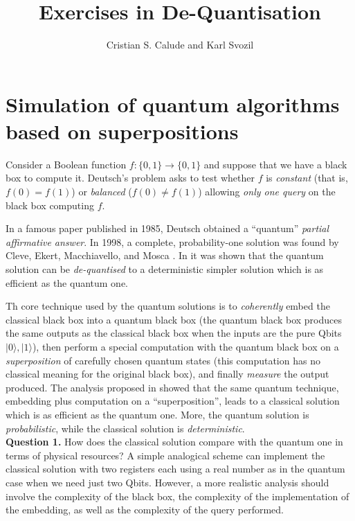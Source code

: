 \documentclass[11pt]{article}
\title{Exercises in De-Quantisation}
\author{Cristian S. Calude and Karl Svozil}
\begin{document}
\maketitle
\section{Simulation of quantum algorithms based on superpositions}
Consider a Boolean function $f: \{0,1\} \rightarrow \{0,1\}$
and suppose that we have a black box to compute it.
Deutsch's problem asks to test
whether $f$ is {\it constant} (that is, $f(0) = f(1)$) or {\it balanced} ($f(0) \not= f(1)$) allowing  {\it only one query} on the black box computing $f$.

In a famous paper published in 1985,  Deutsch \cite{D85} obtained a ``quantum''  {\it partial affirmative answer}.  In 1998, a complete, probability-one
solution was found by Cleve, Ekert, Macchiavello, and Mosca \cite{CEMM}. In \cite{Cris}
it was shown that the quantum solution can be {\it de-quantised} to a deterministic simpler solution which is as efficient as the quantum one.

Th core technique used  by the quantum solutions is to {\it coherently} embed the classical black box into a quantum black box (the quantum black box produces the same outputs as the classical black box when the inputs are the pure Qbits $|0\rangle, |1\rangle$), then perform a special computation with the quantum black box on a {\it superposition} of carefully chosen quantum states (this computation has
no classical meaning for the original black box), and finally {\it measure} the output produced. The analysis proposed in \cite{Cris} showed that
the same quantum technique,
embedding plus computation on a ``superposition'', leads to a  classical solution which is as efficient as the quantum one. More, the quantum solution is {\it probabilistic}, while the classical solution is {\it deterministic}.\\


{\bf Question 1. }
How does the classical solution compare with the quantum one in terms of physical resources?  A simple analogical scheme  can implement the classical solution with two
registers each using a real number as in the quantum case when we need just two Qbits. However, a more realistic analysis should involve the complexity of the black box, the complexity of the implementation of the embedding, as well as the complexity of the query performed.\\
\end{document}
